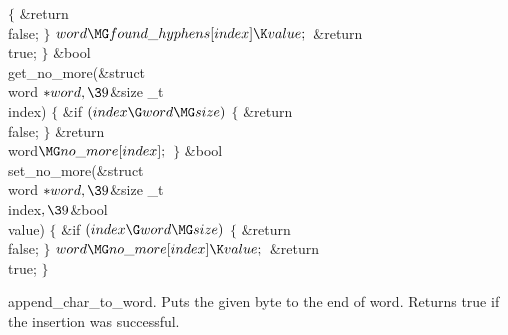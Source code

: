 ${}\{{}$\1\6
\&{return} \\{false};\6
\4${}\}{}$\2\6
${}\\{word}\MG\\{found\_hyphens}[\\{index}]\K\\{value};{}$\6
\&{return} \\{true};\6
\4${}\}{}$\2\7
\1\1\&{bool} \\{get\_no\_more}(\&{struct} \\{word} ${}{*}\\{word},\39{}$\&{size%
\_t} \\{index})\2\2\6
${}\{{}$\1\6
\&{if} ${}(\\{index}\G\\{word}\MG\\{size}){}$\5
${}\{{}$\1\6
\&{return} \\{false};\6
\4${}\}{}$\2\6
\&{return} \\{word}${}\MG\\{no\_more}[\\{index}];{}$\6
\4${}\}{}$\2\7
\1\1\&{bool} \\{set\_no\_more}(\&{struct} \\{word} ${}{*}\\{word},\39{}$\&{size%
\_t} \\{index}${},\39{}$\&{bool} \\{value})\2\2\6
${}\{{}$\1\6
\&{if} ${}(\\{index}\G\\{word}\MG\\{size}){}$\5
${}\{{}$\1\6
\&{return} \\{false};\6
\4${}\}{}$\2\6
${}\\{word}\MG\\{no\_more}[\\{index}]\K\\{value};{}$\6
\&{return} \\{true};\6
\4${}\}{}$\2\par
\fi

append\_char\_to\_word.
Puts the given byte to the end of word. Returns true if the insertion was
successful.

